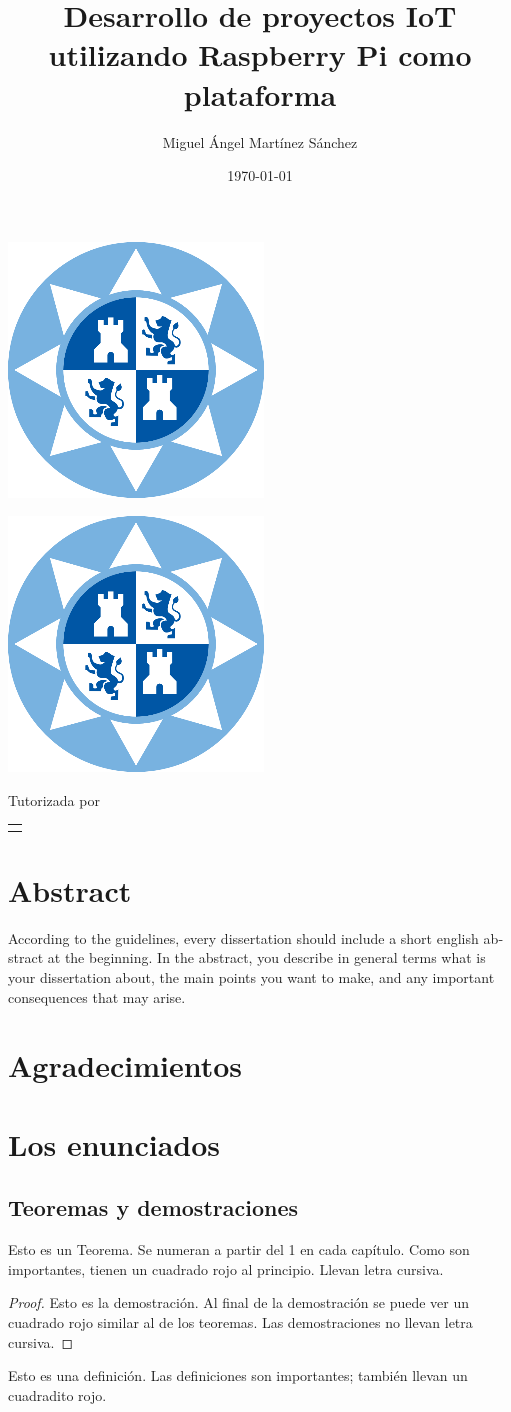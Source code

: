 \documentclass[12pt, twoside]{book}
\title{Desarrollo de proyectos IoT utilizando Raspberry Pi como plataforma}
\author{Miguel Ángel Martínez Sánchez}
\date{\today}
\makeatletter
\renewcommand\maketitle{%
  \begin{titlepage}
      \vspace*{1.5cm}
      \parskip=0pt
      \Huge\bfseries
      \begin{center}
          \leavevmode\includegraphics[totalheight=6cm]{sello.png}\\[2cm]
          \@title
      \end{center}
      \vspace{1cm}
      \begin{center}
          \@author
      \end{center}
  \end{titlepage}
  
  \begin{titlepage}
  \parindent=0pt
  \begin{flushleft}
  \vspace*{1.5mm}
  \setlength\baselineskip{0pt}
  \setlength\parskip{0mm}
  \begin{center}
      \leavevmode\includegraphics[totalheight=4.5cm]{sello.png}
  \end{center}
  \end{flushleft}
  \vspace{1cm}
  \bgroup
  \Large \bfseries
  \begin{center}
  \@title
  \end{center}
  \egroup
  \vspace*{.5cm}
  \begin{center}
  \@author
  \end{center}
  \vspace*{1.8cm}
  \begin{flushright}
  \begin{minipage}{8.45cm}

      \vspace*{7.5mm}

      Tutorizada por
  \end{minipage}\par
  \begin{tabularx}{8.45cm}[b]{@{}l}
      \guardatutores
  \end{tabularx}
   \end{flushright}
      \vspace*{\fill}
   \end{titlepage}
   \pagestyle{tfg}
   \renewcommand{\chaptermark}[1]{\markright{\thechapter.\space ##1}}
   \renewcommand{\sectionmark}[1]{}
   \renewcommand{\subsectionmark}[1]{}
  }
\makeatother
\begin{document}
 

\maketitle

\frontmatter
\tableofcontents

\mainmatter


\chapter*{Abstract}



\begin{otherlanguage}{english}
    According to the guidelines, every dissertation should include a short english abstract at the beginning. In the abstract, you describe in general terms what is your dissertation about, the main points you want to make, and any important consequences that may arise.
\end{otherlanguage}

\chapter*{Agradecimientos}
\chapter{Los enunciados}

\section{Teoremas y demostraciones}


\begin{theorem}[Euclides]\label{thm:th1}
    Esto es un Teorema. Se numeran a partir del 1 en cada capítulo. Como son importantes, tienen un cuadrado rojo al principio. Llevan letra cursiva.
\end{theorem}

\begin{proof}
    Esto es la demostración. Al final de la demostración se puede ver un cuadrado rojo similar al de los teoremas. Las demostraciones no llevan letra cursiva.
\end{proof}


\begin{definition}\label{def:1}
    Esto es una definición. Las definiciones son importantes; también llevan un cuadradito rojo.
\end{definition}
\end{document}

